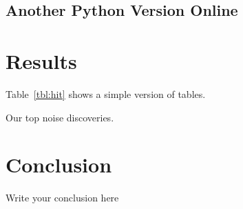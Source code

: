 \documentclass[12pt]{article}
\begin{document}
\subsection{Another Python Version Online}

\section{Results}

Table~\ref{tbl:hit} shows a simple version of tables.

\begin{table}
  \centering
  
  \caption{Our top noise discoveries.}
  \label{tbl:hit}
\end{table}





\section{Conclusion}

Write your conclusion here



\end{document}
